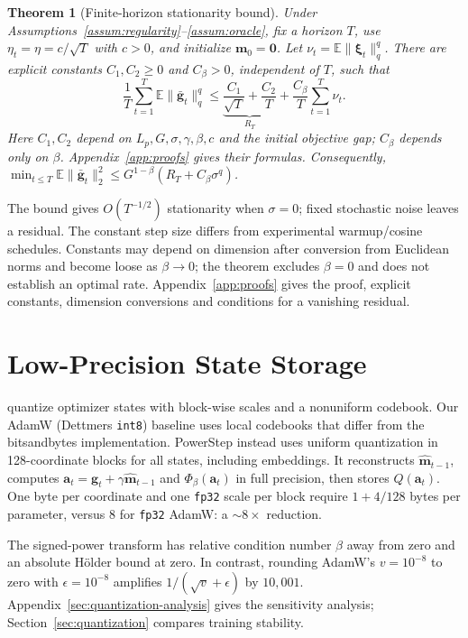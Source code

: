 \documentclass{article}
\newtheorem{theorem}{Theorem}
\begin{document}
\begin{theorem}[Finite-horizon stationarity bound]\label{thm:convergence}
Under Assumptions~\ref{assum:regularity}--\ref{assum:oracle}, fix a horizon $T$, use $\eta_t=\eta=c/\sqrt T$ with $c>0$, and initialize $\mathbf{m}_0=\mathbf{0}$. Let $\nu_t=\mathbb E\|\bm{\xi}_t\|_q^q$. There are explicit constants $C_1,C_2\ge0$ and $C_\beta>0$, independent of $T$, such that
\begin{equation}\label{eq:corrected-rate}
\frac1T\sum_{t=1}^T\mathbb E\|\bar{\mathbf{g}}_t\|_q^q
\le \underbrace{\frac{C_1}{\sqrt T}+\frac{C_2}{T}}_{R_T}
+\frac{C_\beta}{T}\sum_{t=1}^T\nu_t.
\end{equation}
Here $C_1,C_2$ depend on $L_p,G,\sigma,\gamma,\beta,c$ and the initial objective gap; $C_\beta$ depends only on $\beta$. Appendix~\ref{app:proofs} gives their formulas.
Consequently, $\min_{t\le T}\mathbb E\|\bar{\mathbf{g}}_t\|_2^2\le G^{1-\beta}(R_T+C_\beta\sigma^q)$.
\end{theorem}

The bound gives $O(T^{-1/2})$ stationarity when $\sigma=0$; fixed stochastic noise leaves a residual. The constant step size differs from experimental warmup/cosine schedules. Constants may depend on dimension after conversion from Euclidean norms and become loose as $\beta\to0$; the theorem excludes $\beta=0$ and does not establish an optimal rate. Appendix~\ref{app:proofs} gives the proof, explicit constants, dimension conversions and conditions for a vanishing residual.


\section{Low-Precision State Storage}\label{sec:low_precision}
\citet{dettmers2022bit} quantize optimizer states with block-wise scales and a nonuniform codebook. Our AdamW (Dettmers \texttt{int8}) baseline uses local codebooks that differ from the bitsandbytes implementation. PowerStep instead uses uniform quantization in 128-coordinate blocks for all states, including embeddings. It reconstructs $\hat{\mathbf{m}}_{t-1}$, computes $\mathbf{a}_t=\mathbf{g}_t+\gamma\hat{\mathbf{m}}_{t-1}$ and $\Phi_\beta(\mathbf{a}_t)$ in full precision, then stores $Q(\mathbf{a}_t)$. One byte per coordinate and one \texttt{fp32} scale per block require $1+4/128$ bytes per parameter, versus 8 for \texttt{fp32} AdamW: a $\sim8\times$ reduction.

The signed-power transform has relative condition number $\beta$ away from zero and an absolute H\"older bound at zero. In contrast, rounding AdamW's $v=10^{-8}$ to zero with $\epsilon=10^{-8}$ amplifies $1/(\sqrt v+\epsilon)$ by $10{,}001$. Appendix~\ref{sec:quantization-analysis} gives the sensitivity analysis; Section~\ref{sec:quantization} compares training stability.
\end{document}
